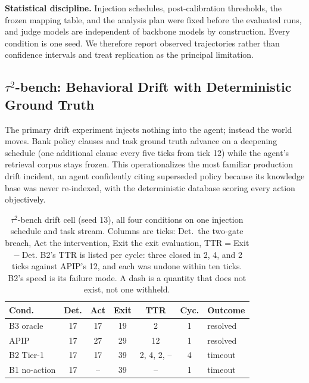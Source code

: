 \documentclass[conference]{IEEEtran}
\begin{document}
\textbf{Statistical discipline.} Injection schedules, post-calibration
thresholds, the frozen mapping table, and the analysis plan were fixed before
the evaluated runs, and judge models are independent of backbone models by
construction. Every condition is one seed. We therefore report observed
trajectories rather than confidence intervals and treat replication as the
principal limitation.

\subsection{$\tau^2$-bench: Behavioral Drift with Deterministic Ground Truth}
\label{sec:taubench}

The primary drift experiment injects nothing into the agent; instead the world
moves. Bank policy clauses and task ground truth advance on a deepening
schedule (one additional clause every five ticks from tick 12) while the
agent's retrieval corpus stays frozen. This operationalizes the most familiar
production drift incident, an agent confidently citing superseded policy
because its knowledge base was never re-indexed, with the deterministic
database scoring every action objectively.

\begin{table}[t]
\caption{$\tau^2$-bench drift cell (seed 13), all four conditions on one
injection schedule and task stream. Columns are ticks: Det.\ the two-gate
breach, Act the intervention, Exit the exit evaluation, TTR${}={}$Exit${}-{}$Det.
B2's TTR is listed per cycle: three closed in 2, 4, and 2 ticks against APIP's
12, and each was undone within ten ticks. B2's speed is its failure mode. A
dash is a quantity that does not exist, not one withheld.}
\label{tab:baselines}
\centering
\scriptsize
\begin{tabular}{@{}lcccccl@{}}
\toprule
\textbf{Cond.} & \textbf{Det.} & \textbf{Act} & \textbf{Exit} & \textbf{TTR} &
\textbf{Cyc.} & \textbf{Outcome} \\
\midrule
B3 oracle      & 17 & 17   & 19 & 2  & 1 & resolved \\
APIP           & 17 & 27   & 29 & 12 & 1 & resolved \\
B2 Tier-1      & 17 & 17   & 39 & 2, 4, 2, -- & 4 & timeout \\
B1 no-action   & 17 & --   & 39 & -- & 1 & timeout \\
\bottomrule
\end{tabular}
\end{table}
\end{document}
